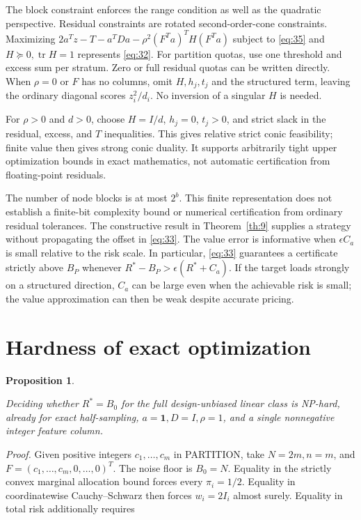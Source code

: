 \documentclass[11pt]{article}
\newtheorem{proposition}[theorem]{Proposition}
\begin{document}
The block constraint enforces the range condition as well as the
quadratic perspective. Residual constraints are rotated
second-order-cone constraints. Maximizing
\(2a^Tz-T-a^TDa-\rho^2(F^Ta)^TH(F^Ta)\) subject to \eqref{eq:35} and
\(H\succeq0,\operatorname{tr}H=1\) represents \eqref{eq:32}. For
partition quotas, use one threshold and excess sum per stratum. Zero or
full residual quotas can be written directly. When \(\rho=0\) or \(F\)
has no columns, omit \(H,h_j,t_j\) and the structured term, leaving the
ordinary diagonal scores \(z_i^2/d_i\). No inversion of a singular \(H\)
is needed.

For \(\rho>0\) and \(d>0\), choose \(H=I/d\), \(h_j=0\), \(t_j>0\), and
strict slack in the residual, excess, and \(T\) inequalities. This gives
relative strict conic feasibility; finite value then gives strong conic
duality. It supports arbitrarily tight upper optimization bounds in
exact mathematics, not automatic certification from floating-point
residuals.

The number of node blocks is at most \(2^b\). This finite representation
does not establish a finite-bit complexity bound or numerical
certification from ordinary residual tolerances. The constructive result in Theorem~\ref{th:9}
supplies a strategy without propagating the offset in
\eqref{eq:33}. The value error is informative when \(\epsilon C_a\) is
small relative to the risk scale. In particular, \eqref{eq:33}
guarantees a certificate strictly above \(B_P\) whenever
\(R^*-B_P>\epsilon(R^*+C_a)\). If the target loads strongly on a
structured direction, \(C_a\) can be large even when the achievable risk
is small; the value approximation can then be weak despite accurate
pricing.

\section{Hardness of exact
optimization}\label{hardness-of-exact-optimization}

\begin{proposition}\label{th:10}

Deciding whether \(R^*=B_0\) for the full design-unbiased linear class
is NP-hard, already for exact half-sampling, \(a=\mathbf1,D=I,\rho=1\),
and a single nonnegative integer feature column.

\end{proposition}

\emph{Proof.} Given positive integers \(c_1,\ldots,c_m\) in PARTITION,
take \(N=2m,n=m\), and \(F=(c_1,\ldots,c_m,0,\ldots,0)^T\). The noise
floor is \(B_0=N\). Equality in the strictly convex marginal allocation
bound forces every \(\pi_i=1/2\). Equality in coordinatewise
Cauchy--Schwarz then forces \(w_i=2I_i\) almost surely. Equality in
total risk additionally requires
\end{document}
